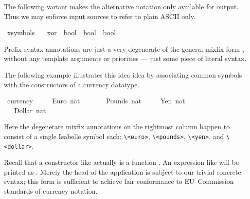 \begin{isabellebody}
\begin{isamarkuptext}
  \medskip The following variant makes the alternative \isa{{\isasymoplus}}
  notation only available for output.  Thus we may enforce input
  sources to refer to plain ASCII only.%
\end{isamarkuptext}%
\isamarkuptrue%
\ {\isacharparenleft}xsymbols\ \isanewline
\ \ xor\ {\isacharcolon}{\isacharcolon}\ {\isachardoublequote}bool\ {\isasymRightarrow}\ bool\ {\isasymRightarrow}\ bool{\isachardoublequote}\ \ \ \ {\isacharparenleft}\ {\isachardoublequote}{\isasymoplus}{\isasymignore}{\isachardoublequote}\ {}{}{\isacharparenright}\isamarkupfalse%
%
\isamarkuptrue%
%
\begin{isamarkuptext}%
Prefix syntax annotations are just a
  very degenerate of the general mixfix form \cite{isabelle-ref},
  without any template arguments or priorities --- just some piece of
  literal syntax.

  The following example illustrates this idea idea by associating
  common symbols with the constructors of a currency datatype.%
\end{isamarkuptext}%
\isamarkuptrue%
\ currency\ {\isacharequal}\isanewline
\ \ \ \ Euro\ nat\ \ \ \ {\isacharparenleft}{\isachardoublequote}{\isasymeuro}{\isachardoublequote}{\isacharparenright}\isanewline
\ \ {\isacharbar}\ Pounds\ nat\ \ {\isacharparenleft}{\isachardoublequote}{\isasympounds}{\isachardoublequote}{\isacharparenright}\isanewline
\ \ {\isacharbar}\ Yen\ nat\ \ \ \ \ {\isacharparenleft}{\isachardoublequote}{\isasymyen}{\isachardoublequote}{\isacharparenright}\isanewline
\ \ {\isacharbar}\ Dollar\ nat\ \ {\isacharparenleft}{\isachardoublequote}{\isachardollar}{\isachardoublequote}{\isacharparenright}\isamarkupfalse%
%
\begin{isamarkuptext}%
Here the degenerate mixfix annotations on the rightmost column
  happen to consist of a single Isabelle symbol each:
  \verb,\,\verb,<euro>,, \verb,\,\verb,<pounds>,,
  \verb,\,\verb,<yen>,, and \verb,\,\verb,<dollar>,.

  Recall that a constructor like  actually is a function
  .  An expression like  will
  be printed as .  Merely the head of the application is
  subject to our trivial concrete syntax; this form is sufficient to
  achieve fair conformance to EU~Commission standards of currency
  notation.


\end{isamarkuptext}
\end{isabellebody}
